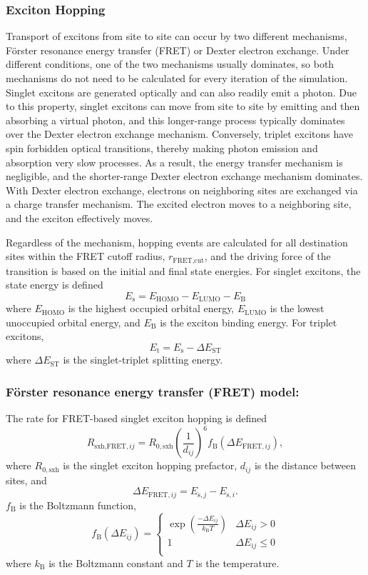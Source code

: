 \documentclass[%
 reprint,onecolumn,notitlepage,
superscriptaddress,longbibliography,
 amsmath,amssymb,
 aps,rmp,floatfix,
]{revtex4-1}
\begin{document}
\subsubsection{Exciton Hopping}

Transport of excitons from site to site can occur by two different mechanisms, F{\"o}rster resonance energy transfer (FRET)\cite{forster1948} or Dexter electron exchange.\cite{dexter1953jcp} 
Under different conditions, one of the two mechanisms usually dominates, so both mechanisms do not need to be calculated for every iteration of the simulation. 
Singlet excitons are generated optically and can also readily emit a photon. 
Due to this property, singlet excitons can move from site to site by emitting and then absorbing a virtual photon, and this longer-range process typically dominates over the Dexter electron exchange mechanism. 
Conversely, triplet excitons have spin forbidden optical transitions, thereby making photon emission and absorption very slow processes. 
As a result, the energy transfer mechanism is negligible, and the shorter-range Dexter electron exchange mechanism dominates. 
With Dexter electron exchange, electrons on neighboring sites are exchanged via a charge transfer mechanism. 
The excited electron moves to a neighboring site, and the exciton effectively moves.

Regardless of the mechanism, hopping events are calculated for all destination sites within the FRET cutoff radius, $r_{\text{FRET,cut}}$, and the driving force of the transition is based on the initial and final state energies.
For singlet excitons, the state energy is defined
$$E_{\text{s}} = E_\text{HOMO} - E_\text{LUMO} - E_\text{B}$$
where $E_\text{HOMO}$ is the highest occupied orbital energy, $E_\text{LUMO}$ is the lowest unoccupied orbital energy, and $E_\text{B}$ is the exciton binding energy.
For triplet excitons, 
$$E_{\text{t}} = E_\text{s} - \Delta E_\text{ST}$$
where $\Delta E_\text{ST}$ is the singlet-triplet splitting energy.

\subsubsection*{\textbf{F{\"o}rster resonance energy transfer (FRET) model:}}

The rate for FRET-based singlet exciton hopping is defined
$$R_{\text{sxh,FRET},ij} = R_{0,\text{sxh}} \left( \frac{1}{d_{ij}} \right)^6 f_\text{B} \left( \Delta E_{\text{FRET},ij}\right),$$
where $R_{0,\text{sxh}}$ is the singlet exciton hopping prefactor, $d_{ij}$ is the distance between sites, and
$$\Delta E_{\text{FRET},ij} = E_{\text{s},j} - E_{\text{s},i}.$$
$f_\text{B}$ is the Boltzmann function,
$$f_\text{B} \left( \Delta E_{ij}\right) = \begin{cases}
\exp{\left( \frac{-\Delta E_{ij}}{k_\text{B} T} \right)} & \Delta E_{ij} > 0 \\
1 & \Delta E_{ij} \le 0 \\
\end{cases}$$
where $k_\text{B}$ is the Boltzmann constant and $T$ is the temperature.
\end{document}
